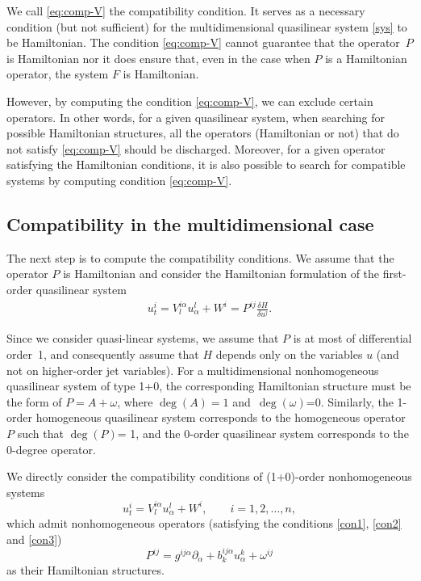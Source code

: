 \documentclass[10pt,a4paper]{amsart}
\numberwithin{equation}{section}
\begin{document}
We call \eqref{eq:comp-V} the compatibility condition. It serves as a necessary condition (but not sufficient) for the multidimensional quasilinear system \eqref{sys} to be Hamiltonian. The condition \eqref{eq:comp-V} cannot guarantee that the operator~$P$ is Hamiltonian nor it does ensure that, even in the case when $P$ is a Hamiltonian operator, the system $F$ is Hamiltonian.

However, by computing the condition \eqref{eq:comp-V}, we can exclude certain operators. In other words, for a given quasilinear system, when searching for possible Hamiltonian structures, all the operators (Hamiltonian or not) that do not satisfy \eqref{eq:comp-V} should be discharged. Moreover, for a given operator satisfying the Hamiltonian conditions, it is also possible to search for compatible systems by computing condition \eqref{eq:comp-V}.

\subsection{Compatibility in the multidimensional case}
The next step is to compute the compatibility conditions. We assume that the operator $P$ is Hamiltonian and consider the Hamiltonian formulation of the first-order quasilinear system
\begin{gather*}
u^i_t=V^{i\alpha}_lu^l_\alpha+W^i=P^{ij}\frac{\delta H}{\delta u^j}.
\end{gather*}

Since we consider quasi-linear systems, we assume that $P$ is at most of differential order~1, and consequently assume that $H$ depends only on the variables $u$ (and not on higher-order jet variables). For a multidimensional nonhomogeneous quasilinear system of type 1+0, the corresponding Hamiltonian structure must be the form of $P=A+\omega$, where $\operatorname{deg}(A)=1$ and~$\operatorname{deg}(\omega)$=0. Similarly, the 1-order homogeneous quasilinear system corresponds to the homogeneous operator $P$ such that $\operatorname{deg}(P)$= 1, and the 0-order quasilinear system corresponds to the 0-degree operator.

We directly consider the compatibility conditions of (1+0)-order nonhomogeneous systems
\begin{equation}\label{nonsys}
u^i_t=V^{i\alpha}_lu^l_\alpha+W^i, \qquad i=1,2,\dots, n,
\end{equation}
which admit nonhomogeneous operators (satisfying the conditions \eqref{con1}, \eqref{con2} and \eqref{con3})
\begin{equation}\label{HS}
P^{ij}=g^{ij\alpha}\partial_\alpha+b^{ij\alpha}_ku^k_\alpha+\omega^{ij}
\end{equation}
as their Hamiltonian structures.
\end{document}
